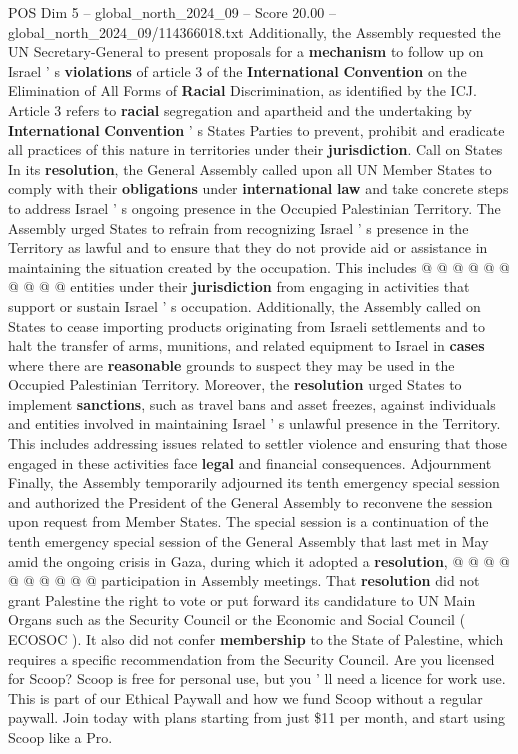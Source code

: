 \begin{textsample}{POS Dim 5 – global\_north\_2024\_09 – Score 20.00 – global\_north\_2024\_09/114366018.txt}
Additionally, the Assembly requested the UN Secretary-General to present proposals for a \textbf{mechanism} to follow up on Israel ' s \textbf{violations} of article 3 of the \textbf{International} \textbf{Convention} on the Elimination of All Forms of \textbf{Racial} Discrimination, as identified by the ICJ.
Article 3 refers to \textbf{racial} segregation and apartheid and the undertaking by \textbf{International} \textbf{Convention} ' s States Parties to prevent, prohibit and eradicate all practices of this nature in territories under their \textbf{jurisdiction}.
Call on States In its \textbf{resolution}, the General Assembly called upon all UN Member States to comply with their \textbf{obligations} under \textbf{international} \textbf{law} and take concrete steps to address Israel ' s ongoing presence in the Occupied Palestinian Territory.
The Assembly urged States to refrain from recognizing Israel ' s presence in the Territory as lawful and to ensure that they do not provide aid or assistance in maintaining the situation created by the occupation.
This includes @ @ @ @ @ @ @ @ @ @ entities under their \textbf{jurisdiction} from engaging in activities that support or sustain Israel ' s occupation.
Additionally, the Assembly called on States to cease importing products originating from Israeli settlements and to halt the transfer of arms, munitions, and related equipment to Israel in \textbf{cases} where there are \textbf{reasonable} grounds to suspect they may be used in the Occupied Palestinian Territory.
Moreover, the \textbf{resolution} urged States to implement \textbf{sanctions}, such as travel bans and asset freezes, against individuals and entities involved in maintaining Israel ' s unlawful presence in the Territory.
This includes addressing issues related to settler violence and ensuring that those engaged in these activities face \textbf{legal} and financial consequences.
Adjournment Finally, the Assembly temporarily adjourned its tenth emergency special session and authorized the President of the General Assembly to reconvene the session upon request from Member States.
The special session is a continuation of the tenth emergency special session of the General Assembly that last met in May amid the ongoing crisis in Gaza, during which it adopted a \textbf{resolution}, @ @ @ @ @ @ @ @ @ @ participation in Assembly meetings.
That \textbf{resolution} did not grant Palestine the right to vote or put forward its candidature to UN Main Organs such as the Security Council or the Economic and Social Council ( ECOSOC ).
It also did not confer \textbf{membership} to the State of Palestine, which requires a specific recommendation from the Security Council.
Are you licensed for Scoop?
Scoop is free for personal use, but you ' ll need a licence for work use.
This is part of our Ethical Paywall and how we fund Scoop without a regular paywall.
Join today with plans starting from just \$11 per month, and start using Scoop like a Pro.

\end{textsample}
